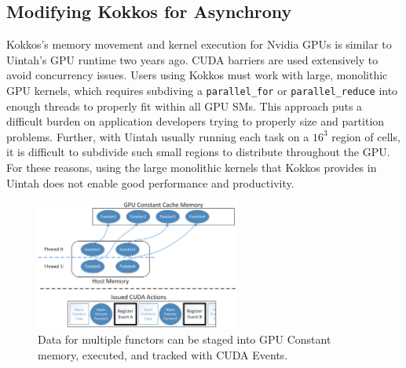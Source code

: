 \documentclass[12pt]{article}
\begin{document}



\subsection{Modifying Kokkos for Asynchrony}
\label{ch:kokkos_modifications}
Kokkos's memory movement and kernel execution for Nvidia GPUs is similar to Uintah's GPU runtime two years ago.  CUDA barriers are used extensively to avoid concurrency issues.  Users using Kokkos must work with large, monolithic GPU kernels, which requires subdiving a \texttt{parallel\_for} or \texttt{parallel\_reduce} into enough threads to properly fit within all GPU SMs.  This approach puts a difficult burden on application developers trying to properly size and partition problems.  Further, with Uintah usually running each task on a $16^3$ region of cells, it is difficult to subdivide such small regions to distribute throughout the GPU.  For these reasons, using the large monolithic kernels that Kokkos provides in Uintah does not enable good performance and productivity.

\begin{figure}
	\centering
	\includegraphics[width=0.60\textwidth]{figures/Kokkos_constant_cache_new.png}
	\caption{Data for multiple functors can be staged into GPU Constant memory, executed, and tracked with CUDA Events.   }
	\label{fig:kokkos-constant-cache-new}
\end{figure}
\end{document}
